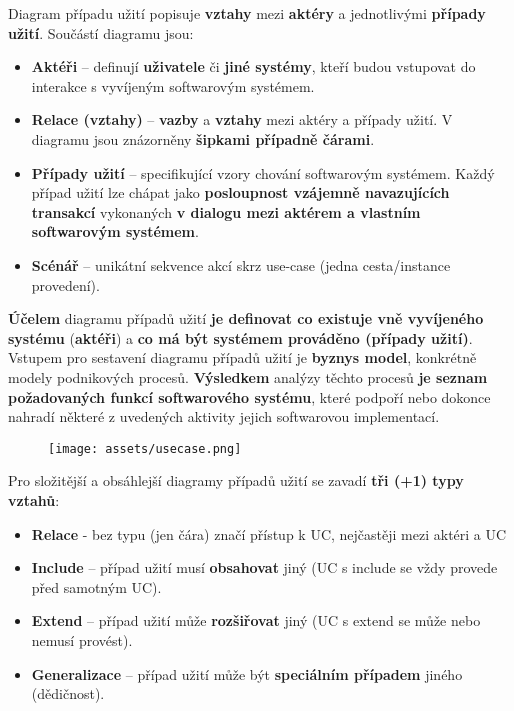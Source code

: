 Diagram případu užití popisuje \textbf{vztahy} mezi \textbf{aktéry} a jednotlivými \textbf{případy užití}. Součástí diagramu jsou:
\begin{itemize}
    \item \textbf{Aktéři} -- definují \textbf{uživatele} či \textbf{jiné systémy}, kteří budou vstupovat do interakce s vyvíjeným softwarovým systémem.
    \item \textbf{Relace (vztahy)} -- \textbf{vazby} a \textbf{vztahy} mezi aktéry a případy užití. V diagramu jsou znázorněny \textbf{šipkami případně čárami}.
    \item \textbf{Případy užití} -- specifikující vzory chování  softwarovým systémem.  Každý případ užití lze chápat jako \textbf{posloupnost vzájemně navazujících transakcí} vykonaných \textbf{v dialogu mezi aktérem a vlastním softwarovým systémem}.
    \item \textbf{Scénář} -- unikátní sekvence akcí skrz use-case (jedna cesta/instance provedení).
\end{itemize}
\textbf{Účelem} diagramu případů užití \textbf{je definovat co existuje vně vyvíjeného systému} (\textbf{aktéři}) a \textbf{co má být systémem prováděno (případy užití)}. Vstupem pro sestavení diagramu případů užití je \textbf{byznys model}, konkrétně modely podnikových procesů.  \textbf{Výsledkem} analýzy těchto procesů \textbf{je seznam požadovaných funkcí softwarového systému}, které podpoří nebo dokonce nahradí některé z uvedených aktivity jejich softwarovou implementací.

\begin{figure}[H]
    \centering
    \texttt{[image: assets/usecase.png]}
\end{figure}

\noindent Pro složitější a obsáhlejší diagramy případů užití se zavadí \textbf{tři (+1) typy vztahů}:
\begin{itemize}
    \item \textbf{Relace} - bez typu (jen čára) značí přístup k UC, nejčastěji mezi aktéri a UC
    \item \textbf{Include} – případ užití musí \textbf{obsahovat} jiný (UC s include se vždy provede před samotným UC).
    \item \textbf{Extend} – případ užití může \textbf{rozšiřovat} jiný (UC s extend se může nebo nemusí provést).
    \item \textbf{Generalizace} – případ užití může být \textbf{speciálním případem} jiného (dědičnost).
\end{itemize}

